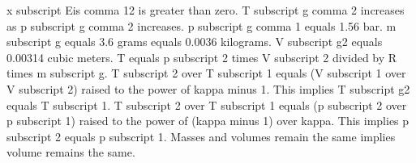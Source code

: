 x subscript Eis comma 12 is greater than zero.
T subscript g comma 2 increases as p subscript g comma 2 increases.
p subscript g comma 1 equals 1.56 bar.
m subscript g equals 3.6 grams equals 0.0036 kilograms.
V subscript g2 equals 0.00314 cubic meters.
T equals p subscript 2 times V subscript 2 divided by R times m subscript g.
T subscript 2 over T subscript 1 equals (V subscript 1 over V subscript 2) raised to the power of kappa minus 1.
This implies T subscript g2 equals T subscript 1.
T subscript 2 over T subscript 1 equals (p subscript 2 over p subscript 1) raised to the power of (kappa minus 1) over kappa.
This implies p subscript 2 equals p subscript 1.
Masses and volumes remain the same implies volume remains the same.